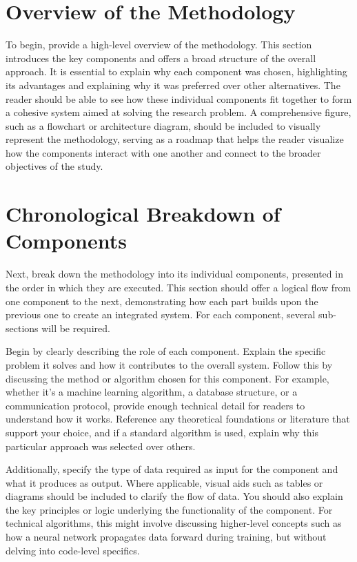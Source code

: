 \documentclass{iutbscthesis}
\begin{document}
\section{Overview of the Methodology}

To begin, provide a high-level overview of the methodology. This section introduces the key components and offers a broad structure of the overall approach. It is essential to explain why each component was chosen, highlighting its advantages and explaining why it was preferred over other alternatives. The reader should be able to see how these individual components fit together to form a cohesive system aimed at solving the research problem. A comprehensive figure, such as a flowchart or architecture diagram, should be included to visually represent the methodology, serving as a roadmap that helps the reader visualize how the components interact with one another and connect to the broader objectives of the study.

\section{Chronological Breakdown of Components}

Next, break down the methodology into its individual components, presented in the order in which they are executed. This section should offer a logical flow from one component to the next, demonstrating how each part builds upon the previous one to create an integrated system. For each component, several sub-sections will be required.

Begin by clearly describing the role of each component. Explain the specific problem it solves and how it contributes to the overall system. Follow this by discussing the method or algorithm chosen for this component. For example, whether it's a machine learning algorithm, a database structure, or a communication protocol, provide enough technical detail for readers to understand how it works. Reference any theoretical foundations or literature that support your choice, and if a standard algorithm is used, explain why this particular approach was selected over others.

Additionally, specify the type of data required as input for the component and what it produces as output. Where applicable, visual aids such as tables or diagrams should be included to clarify the flow of data. You should also explain the key principles or logic underlying the functionality of the component. For technical algorithms, this might involve discussing higher-level concepts such as how a neural network propagates data forward during training, but without delving into code-level specifics.
\end{document}

